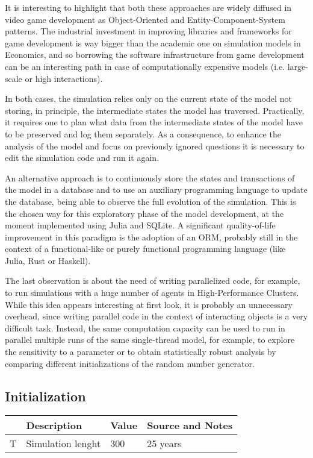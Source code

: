 \documentclass[a4paper, headings=standardclasses]{scrartcl}
\begin{document}
It is interesting to highlight that both these approaches are widely diffused in video game development as Object-Oriented and Entity-Component-System patterns. The industrial investment in improving libraries and frameworks for game development is way bigger than the academic one on simulation models in Economics, and so borrowing the software infrastructure from game development can be an interesting path in case of computationally expensive models (i.e. large-scale or high interactions).

In both cases, the simulation relies only on the current state of the model not storing, in principle, the intermediate states the model has traversed. Practically, it requires one to plan what data from the intermediate states of the model have to be preserved and log them separately. As a consequence, to enhance the analysis of the model and focus on previously ignored questions it is necessary to edit the simulation code and run it again.

An alternative approach is to continuously store the states and transactions of the model in a database and to use an auxiliary programming language to update the database, being able to observe the full evolution of the simulation.
This is the chosen way for this exploratory phase of the model development, at the moment implemented using Julia and SQLite. A significant quality-of-life improvement in this paradigm is the adoption of an ORM, probably still in the context of a functional-like or purely functional programming language (like Julia, Rust or Haskell).

The last observation is about the need of writing parallelized code, for example, to run simulations with a huge number of agents in High-Performance Clusters. While this idea appears interesting at first look, it is probably an unnecessary overhead, since writing parallel code in the context of interacting objects is a very difficult task.
Instead, the same computation capacity can be used to run in parallel multiple runs of the same single-thread model, for example, to explore the sensitivity to a parameter or to obtain statistically robust analysis by comparing different initializations of the random number generator.

\subsection{Initialization}
\begin{xltabular}{\linewidth}{lXlX}
    \toprule
    & Description                                                  & Value & Source and Notes                                                                                                                                            \\
    \toprule \endhead
    \bottomrule \endfoot
    T & Simulation lenght & 300 & 25 years \\
\end{xltabular}
\end{document}
